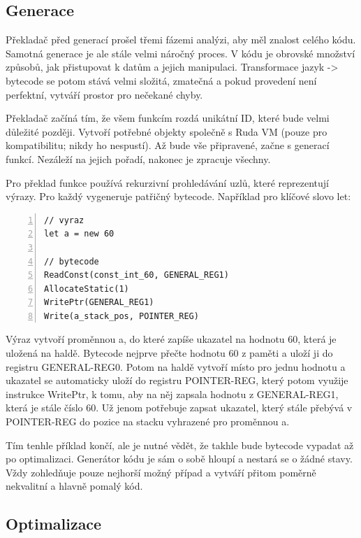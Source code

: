 \documentclass[12pt, a4paper,
twoside,        %
openright
]{report}
\begin{document}
\subsection{Generace}

Překladač před generací prošel třemi fázemi analýzi, aby měl znalost celého kódu. Samotná generace je ale stále velmi náročný proces. V kódu je obrovské množství způsobů, jak přistupovat k datům a jejich manipulaci. Transformace jazyk -> bytecode se potom stává velmi složitá, zmatečná a pokud provedení není perfektní, vytváří prostor pro nečekané chyby.

Překladač začíná tím, že všem funkcím rozdá unikátní ID, které bude velmi důležité později. Vytvoří potřebné objekty společně s Ruda VM (pouze pro kompatibilitu; nikdy ho nespustí). Až bude vše připravené, začne s generací funkcí. Nezáleží na jejich pořadí, nakonec je zpracuje všechny.

Pro překlad funkce používá rekurzivní prohledávání uzlů, které reprezentují výrazy. Pro každý vygeneruje patřičný bytecode. Například pro klíčové slovo let:

\begin{lstlisting}[numbers=left, caption={Překlad klíčového slova let}]
// vyraz
let a = new 60

// bytecode
ReadConst(const_int_60, GENERAL_REG1)
AllocateStatic(1)     
WritePtr(GENERAL_REG1)   
Write(a_stack_pos, POINTER_REG)  
\end{lstlisting}

Výraz vytvoří proměnnou a, do které zapíše ukazatel na hodnotu 60, která je uložená na haldě. Bytecode nejprve přečte hodnotu 60 z paměti a uloží ji do registru GENERAL-REG0. Potom na haldě vytvoří místo pro jednu hodnotu a ukazatel se automaticky uloží do registru POINTER-REG, který potom využije instrukce WritePtr, k tomu, aby na něj zapsala hodnotu z GENERAL-REG1, která je stále číslo 60. Už jenom potřebuje zapsat ukazatel, který stále přebývá v POINTER-REG do pozice na stacku vyhrazené pro proměnnou a.

Tím tenhle příklad končí, ale je nutné vědět, že takhle bude bytecode vypadat až po optimalizaci. Generátor kódu je sám o sobě hloupí a nestará se o žádné stavy. Vždy zohledňuje pouze nejhorší možný případ a vytváří přitom poměrně nekvalitní a hlavně pomalý kód.

\subsection{Optimalizace}
\end{document}
